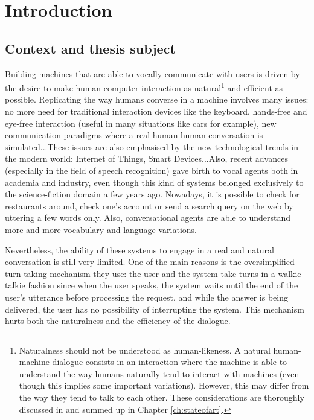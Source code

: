 \chapter*{Introduction}

\section*{Context and thesis subject}

				Building machines that are able to vocally communicate with users is driven by the desire to make human-computer interaction as natural\footnote{Naturalness should not be understood as human-likeness. A natural human-machine dialogue consists in an interaction where the machine is able to understand the way humans naturally tend to interact with machines (even though this implies some important variations). However, this may differ from the way they tend to talk to each other. These considerations are thoroughly discussed in \cite{Edlund2008} and summed up in Chapter \ref{ch:stateofart}.} and efficient as possible. Replicating the way humans converse in a machine involves many issues: no more need for traditional interaction devices like the keyboard, hands-free and eye-free interaction (useful in many situations like cars for example), new communication paradigms where a real human-human conversation is simulated...These issues are also emphasised by the new technological trends in the modern world: Internet of Things, Smart Devices...Also, recent advances (especially in the field of speech recognition) gave birth to vocal agents both in academia and industry, even though this kind of systems belonged exclusively to the science-fiction domain a few years ago. Nowadays, it is possible to check for restaurants around, check one's account or send a search query on the web by uttering a few words only. Also, conversational agents are able to understand more and more vocabulary and language variations.
				
				Nevertheless, the ability of these systems to engage in a real and natural conversation is still very limited. One of the main reasons is the oversimplified turn-taking mechanism they use: the user and the system take turns in a walkie-talkie fashion since when the user speaks, the system waits until the end of the user's utterance before processing the request, and while the answer is being delivered, the user has no possibility of interrupting the system. This mechanism hurts both the naturalness and the efficiency of the dialogue.
				
